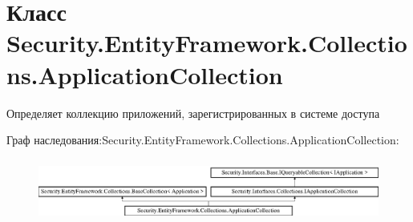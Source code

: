 \hypertarget{class_security_1_1_entity_framework_1_1_collections_1_1_application_collection}{}\section{Класс Security.\+Entity\+Framework.\+Collections.\+Application\+Collection}
\label{class_security_1_1_entity_framework_1_1_collections_1_1_application_collection}


Определяет коллекцию приложений, зарегистрированных в системе доступа  


Граф наследования\+:Security.\+Entity\+Framework.\+Collections.\+Application\+Collection\+:\begin{figure}[H]
\begin{center}
\leavevmode
\includegraphics[height=2.068965cm]{d2/d27/class_security_1_1_entity_framework_1_1_collections_1_1_application_collection}
\end{center}
\end{figure}
